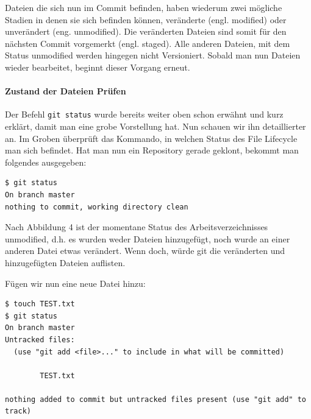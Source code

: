 \documentclass[12pt,a4paper,bibliography=totocnumbered,listof=totocnumbered]{scrartcl}
\begin{document}
Dateien die sich nun im Commit befinden, haben wiederum zwei mögliche Stadien in denen sie sich befinden können, veränderte (engl. modified) oder unverändert (eng. unmodified). Die veränderten Dateien sind somit für den nächsten Commit vorgemerkt (engl. staged). Alle anderen Dateien, mit dem Status unmodified werden hingegen nicht Versioniert. Sobald man nun Dateien wieder bearbeitet, beginnt dieser Vorgang erneut.

\paragraph{Zustand der Dateien Prüfen}
Der Befehl \lstinline|git status| wurde bereits weiter oben schon erwähnt und kurz erklärt, damit man eine grobe Vorstellung hat. Nun schauen wir ihn detaillierter an. Im Groben überprüft das Kommando, in welchen Status des File Lifecycle man sich befindet. Hat man nun ein Repository gerade geklont, bekommt man folgendes ausgegeben:

\vspace{1em}
\begin{lstlisting}[caption=Git Statusbefehl nach git clone befehl, label=lst:arduino]
$ git status
On branch master
nothing to commit, working directory clean 
\end{lstlisting}

Nach Abbildung 4 ist der momentane Status des Arbeitsverzeichnisses unmodified, d.h. 
es wurden weder Dateien hinzugefügt, noch wurde an einer anderen Datei etwas verändert. Wenn doch, würde git die veränderten und hinzugefügten Dateien auflisten.

Fügen wir nun eine neue Datei hinzu: 
\vspace{1em}
\begin{lstlisting}[caption=Git Statusbefehl nach dem erzeugen einer Datei, label=lst:arduino]
$ touch TEST.txt
$ git status
On branch master
Untracked files:
  (use "git add <file>..." to include in what will be committed)

        TEST.txt

nothing added to commit but untracked files present (use "git add" to track)

\end{lstlisting}
\end{document}
